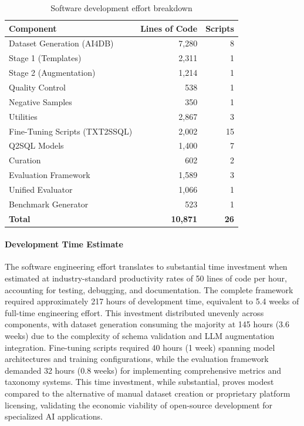 \begin{table}%
\centering
\begin{tabular}{lrr}
\toprule
\textbf{Component} & \textbf{Lines of Code} & \textbf{Scripts} \\
\midrule
Dataset Generation (AI4DB) & 7,280 & 8 \\
\quad Stage 1 (Templates) & 2,311 & 1 \\

\quad Stage 2 (Augmentation) & 1,214 & 1 \\
\quad Quality Control & 538 & 1 \\
\quad Negative Samples & 350 & 1 \\
\quad Utilities & 2,867 & 3 \\
\midrule
Fine-Tuning Scripts (TXT2SSQL) & 2,002 & 15 \\
\quad Q2SQL Models & 1,400 & 7 \\

\quad Curation & 602 & 2 \\
\midrule
Evaluation Framework & 1,589 & 3 \\
\quad Unified Evaluator & 1,066 & 1 \\
\quad Benchmark Generator & 523 & 1 \\

\midrule
\textbf{Total} & \textbf{10,871} & \textbf{26} \\
\bottomrule
\end{tabular}
\caption{Software development effort breakdown}
\end{table}

\paragraph{Development Time Estimate}

The software engineering effort translates to substantial time investment when estimated at industry-standard productivity rates of 50 lines of code per hour, accounting for testing, debugging, and documentation. The complete framework required approximately 217 hours of development time, equivalent to 5.4 weeks of full-time engineering effort. This investment distributed unevenly across components, with dataset generation consuming the majority at 145 hours (3.6 weeks) due to the complexity of schema validation and LLM augmentation integration. Fine-tuning scripts required 40 hours (1 week) spanning model architectures and training configurations, while the evaluation framework demanded 32 hours (0.8 weeks) for implementing comprehensive metrics and taxonomy systems. This time investment, while substantial, proves modest compared to the alternative of manual dataset creation or proprietary platform licensing, validating the economic viability of open-source development for specialized AI applications.


